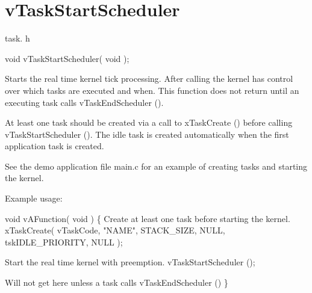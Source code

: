 \hypertarget{group__v_task_start_scheduler}{\section{v\-Task\-Start\-Scheduler}
\label{group__v_task_start_scheduler}
}
task. h 
\begin{DoxyPre}void vTaskStartScheduler( void );\end{DoxyPre}


Starts the real time kernel tick processing. After calling the kernel has control over which tasks are executed and when. This function does not return until an executing task calls v\-Task\-End\-Scheduler ().

At least one task should be created via a call to x\-Task\-Create () before calling v\-Task\-Start\-Scheduler (). The idle task is created automatically when the first application task is created.

See the demo application file main.\-c for an example of creating tasks and starting the kernel.

Example usage\-: 
\begin{DoxyPre}
 void vAFunction( void )
 \{
Create at least one task before starting the kernel.
         xTaskCreate( vTaskCode, "NAME", STACK\_SIZE, NULL, tskIDLE\_PRIORITY, NULL );\end{DoxyPre}



\begin{DoxyPre}Start the real time kernel with preemption.
         vTaskStartScheduler ();\end{DoxyPre}



\begin{DoxyPre}Will not get here unless a task calls vTaskEndScheduler ()
 \}
   \end{DoxyPre}
 